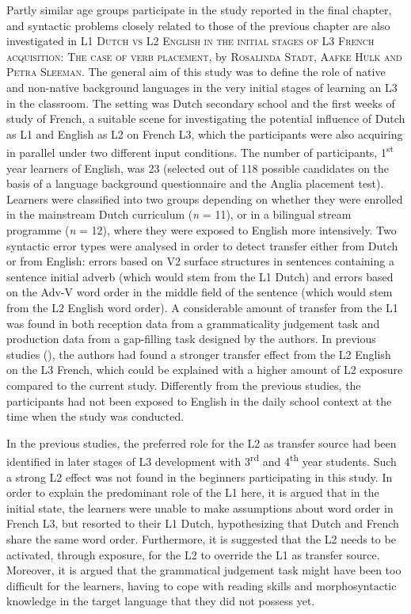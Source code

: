 \documentclass[output=paper,colorlinks,citecolor=brown,nonflat]{langsci/langscibook}
\begin{document}
Partly similar age groups participate in the study reported in the final chapter, and syntactic problems closely related to those of the previous chapter are also investigated in \textsc{L1 Dutch vs L2 English in the initial stages of L3 French acquisition: The case of verb placement}, by \textsc{Rosalinda Stadt, Aafke Hulk and Petra Sleeman}. The general aim of this study was to define the role of native and non-native background languages in the very initial stages of learning an L3 in the classroom. The setting was Dutch secondary school and the first weeks of study of French, a suitable scene for investigating the potential influence of Dutch as L1 and English as L2 on French L3, which the participants were also acquiring in parallel under two different input conditions. The number of participants, 1\textsuperscript{st} year learners of English, was 23 (selected out of 118 possible candidates on the basis of a language background questionnaire and the Anglia placement test). Learners were classified into two groups depending on whether they were enrolled in the mainstream Dutch curriculum (\textit{n} = 11), or in a bilingual stream programme (\textit{n} = 12), where they were exposed to English more intensively. Two syntactic error types were analysed in order to detect transfer either from Dutch or from English: errors based on V2 surface structures in sentences containing a sentence initial adverb (which would stem from the L1 Dutch) and errors based on the Adv-V word order in the middle field of the sentence (which would stem from the L2 English word order). A considerable amount of transfer from the L1 was found in both reception data from a grammaticality judgement task and production data from a gap-filling task designed by the authors. In previous studies (\citealt{StadtEtAl2016, StadtEtAl2018Exposure}), the authors had found a stronger transfer effect from the L2 English on the L3 French, which could be explained with a higher amount of L2 exposure compared to the current study. Differently from the previous studies, the participants had not been exposed to English in the daily school context at the time when the study was conducted.

In the previous studies, the preferred role for the L2 as transfer source had been identified in later stages of L3 development with 3\textsuperscript{rd} and 4\textsuperscript{th} year students. Such a strong L2 effect was not found in the beginners participating in this study. In order to explain the predominant role of the L1 here, it is argued that in the initial state, the learners were unable to make assumptions about word order in French L3, but resorted to their L1 Dutch, hypothesizing that Dutch and French share the same word order. Furthermore, it is suggested that the L2 needs to be activated, through exposure, for the L2 to override the L1 as transfer source. Moreover, it is argued that the grammatical judgement task might have been too difficult for the learners, having to cope with reading skills and morphosyntactic knowledge in the target language that they did not possess yet.
\end{document}
